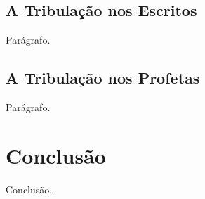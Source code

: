 \subsection{A Tribulação nos Escritos}

    Parágrafo.

\subsection{A Tribulação nos Profetas}

    Parágrafo.



\section{Conclusão}

    Conclusão.

